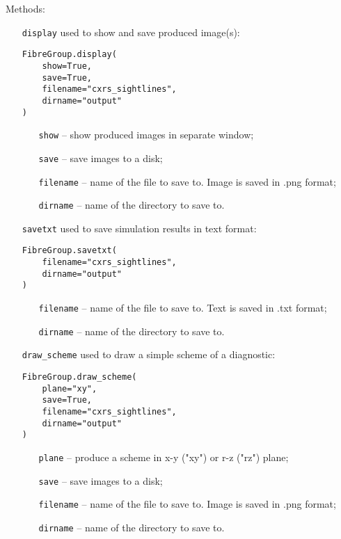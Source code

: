 \documentclass[../main.tex]{subfiles}
\begin{document}
Methods:
\begin{itemize}[align=left]
    \item[\texttt{display}] used to show and save produced image(s):
          \begin{verbatim}
FibreGroup.display(
    show=True,
    save=True,
    filename="cxrs_sightlines",
    dirname="output"
)
        \end{verbatim}
          \begin{itemize}[align=left]
              \item[\texttt{show}] -- show produced images in separate window;
              \item[\texttt{save}] -- save images to a disk;
              \item[\texttt{filename}] -- name of the file to save to. Image is saved in .png format;
              \item[\texttt{dirname}] -- name of the directory to save to.
          \end{itemize}

    \item[\texttt{savetxt}] used to save simulation results in text format:
          \begin{verbatim}
FibreGroup.savetxt(
    filename="cxrs_sightlines",
    dirname="output"
)
        \end{verbatim}
          \begin{itemize}[align=left]
              \item[\texttt{filename}] -- name of the file to save to. Text is saved in .txt format;
              \item[\texttt{dirname}] -- name of the directory to save to.
          \end{itemize}

    \item[\texttt{draw\_scheme}] used to draw a simple scheme of a diagnostic:
          \begin{verbatim}
FibreGroup.draw_scheme(
    plane="xy",
    save=True,
    filename="cxrs_sightlines",
    dirname="output"
)
        \end{verbatim}
          \begin{itemize}[align=left]
              \item[\texttt{plane}] -- produce a scheme in x-y ("xy") or r-z ("rz") plane;
              \item[\texttt{save}] -- save images to a disk;
              \item[\texttt{filename}] -- name of the file to save to. Image is saved in .png format;
              \item[\texttt{dirname}] -- name of the directory to save to.
          \end{itemize}
\end{itemize}
\end{document}
